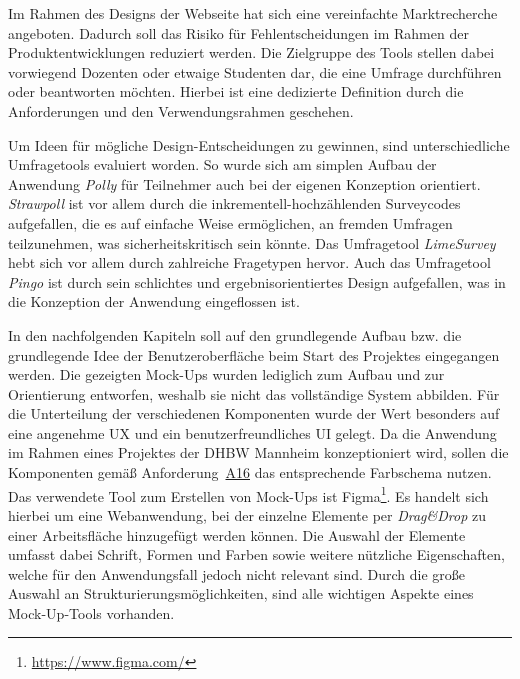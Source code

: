 Im Rahmen des Designs der Webseite hat sich eine vereinfachte Marktrecherche angeboten.
Dadurch soll das Risiko für Fehlentscheidungen im Rahmen der Produktentwicklungen reduziert werden.\autocite{Pioch2019}
Die Zielgruppe des Tools stellen dabei vorwiegend Dozenten oder etwaige Studenten dar, die eine Umfrage durchführen oder beantworten möchten.
Hierbei ist eine dedizierte Definition durch die Anforderungen und den Verwendungsrahmen geschehen.

Um Ideen für mögliche Design-Entscheidungen zu gewinnen, sind unterschiedliche Umfragetools evaluiert worden.
So wurde sich am simplen Aufbau der Anwendung \emph{Polly} für Teilnehmer auch bei der eigenen Konzeption orientiert.
\emph{Strawpoll} ist vor allem durch die inkrementell-hochzählenden Surveycodes aufgefallen, die es auf einfache Weise ermöglichen, an fremden Umfragen teilzunehmen, was sicherheitskritisch sein könnte.
Das Umfragetool \emph{LimeSurvey} hebt sich vor allem durch zahlreiche Fragetypen hervor.
Auch das Umfragetool \emph{Pingo} ist durch sein schlichtes und ergebnisorientiertes Design aufgefallen, was in die Konzeption der Anwendung eingeflossen ist.

In den nachfolgenden Kapiteln soll auf den grundlegende Aufbau bzw. die grundlegende Idee der Benutzeroberfläche beim Start des Projektes eingegangen werden.
Die gezeigten Mock-Ups wurden lediglich zum Aufbau und zur Orientierung entworfen, weshalb sie nicht das vollständige System abbilden.
Für die Unterteilung der verschiedenen Komponenten wurde der Wert besonders auf eine angenehme \acf{UX} und ein benutzerfreundliches \acf{UI} gelegt.
Da die Anwendung im Rahmen eines Projektes der \acs{DHBW} Mannheim konzeptioniert wird, sollen die Komponenten gemäß Anforderung~\hyperref[Anf:A16]{A16} das entsprechende Farbschema nutzen.
Das verwendete Tool zum Erstellen von Mock-Ups ist Figma\footnote{\url{https://www.figma.com/}}.
Es handelt sich hierbei um eine Webanwendung, bei der einzelne Elemente per \emph{Drag\&Drop} zu einer Arbeitsfläche hinzugefügt werden können.
Die Auswahl der Elemente umfasst dabei Schrift, Formen und Farben sowie weitere nützliche Eigenschaften, welche für den Anwendungsfall jedoch nicht relevant sind.
Durch die große Auswahl an Strukturierungsmöglichkeiten, sind alle wichtigen Aspekte eines Mock-Up-Tools vorhanden.
